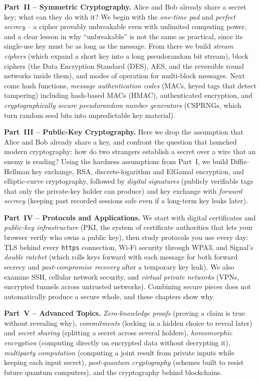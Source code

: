 \textbf{Part~II -- Symmetric Cryptography.} Alice and Bob already share a secret key; what can they do with it? We begin with the \emph{one-time pad} and \emph{perfect secrecy} -- a cipher provably unbreakable even with unlimited computing power, and a clear lesson in why ``unbreakable'' is not the same as practical, since its single-use key must be as long as the message. From there we build \emph{stream ciphers} (which expand a short key into a long pseudorandom bit stream), block ciphers (the Data Encryption Standard (DES), AES, and the reversible round networks inside them), and modes of operation for multi-block messages. Next come hash functions, \emph{message authentication codes} (MACs, keyed tags that detect tampering) including hash-based MACs (HMAC), authenticated encryption, and \emph{cryptographically secure pseudorandom number generators} (CSPRNGs, which turn random seed bits into unpredictable key material).

\textbf{Part~III -- Public-Key Cryptography.} Here we drop the assumption that Alice and Bob already share a key, and confront the question that launched modern cryptography: how do two strangers establish a secret over a wire that an enemy is reading? Using the hardness assumptions from Part~I, we build Diffie--Hellman key exchange, RSA, discrete-logarithm and ElGamal encryption, and elliptic-curve cryptography, followed by \emph{digital signatures} (publicly verifiable tags that only the private-key holder can produce) and key exchange with \emph{forward secrecy} (keeping past recorded sessions safe even if a long-term key leaks later).

\textbf{Part~IV -- Protocols and Applications.} We start with digital certificates and \emph{public-key infrastructure} (PKI, the system of certificate authorities that lets your browser verify who owns a public key), then study protocols you use every day: TLS behind every \texttt{https} connection, Wi-Fi security through WPA3, and Signal's \emph{double ratchet} (which rolls keys forward with each message for both forward secrecy and \emph{post-compromise recovery} after a temporary key leak). We also examine SSH, cellular network security, and \emph{virtual private networks} (VPNs, encrypted tunnels across untrusted networks). Combining secure pieces does not automatically produce a secure whole, and these chapters show why.

\textbf{Part~V -- Advanced Topics.} \emph{Zero-knowledge proofs} (proving a claim is true without revealing why), \emph{commitments} (locking in a hidden choice to reveal later) and \emph{secret sharing} (splitting a secret across several holders), \emph{homomorphic encryption} (computing directly on encrypted data without decrypting it), \emph{multiparty computation} (computing a joint result from private inputs while keeping each input secret), \emph{post-quantum cryptography} (schemes built to resist future quantum computers), and the cryptography behind blockchains.

